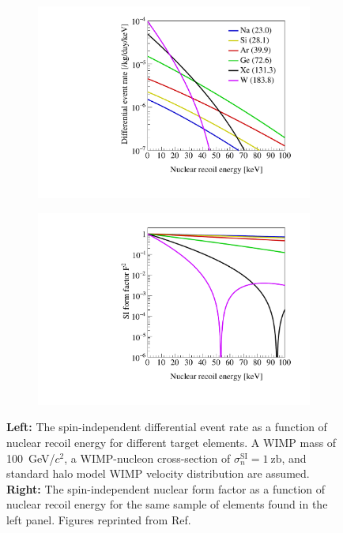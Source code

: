 \begin{figure}[!h]
     \centering
     \begin{subfigure}{0.49\textwidth}
         \centering
         \includegraphics[width=\textwidth]{figures/DMOverview/wimp_event_rate_si_m100.pdf}
         \caption{}
         \label{fig:DMOverview/SINuclearRecoilRate}
     \end{subfigure}
     \hfill
     \begin{subfigure}{0.49\textwidth}
         \centering
         \includegraphics[width=\textwidth]{figures/DMOverview/wimp_event_rate_si_m100_ff.pdf}
         \caption{}
         \label{fig:DMOverview/SIFF}
     \end{subfigure}
     \caption[The spin-independent differential event rate and the spin-independent nuclear form factor as a function of nuclear recoil energy for different target elements.]{\textbf{Left:} The spin-independent differential event rate as a function of nuclear recoil energy for different target elements. A WIMP mass of 100~GeV/$c^2$, a WIMP-nucleon cross-section of $\sigma^\text{SI}_n=1~\text{zb}$, and standard halo model WIMP velocity distribution are assumed. \textbf{Right:} The spin-independent nuclear form factor as a function of nuclear recoil energy for the same sample of elements found in the left panel. Figures reprinted from Ref.~\cite{OlcinaSamblas:thesis}}
     \label{fig:DMOverview/SINRRandFF}
\end{figure}

